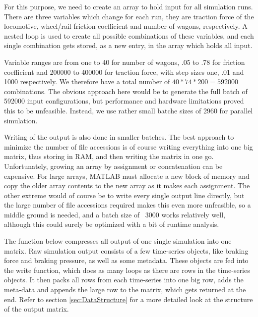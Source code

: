 \par\noindent
 For this purpose, we need to create an array to hold input for all simulation runs. There are three variables which change for each run, they are traction force of the locomotive, wheel/rail friction coefficient and number of wagons, respectively. A nested loop is used to create all possible combinations of these variables, and each single combination gets stored, as a new entry, in the array which holds all input.
\par
Variable ranges are from one to 40 for number of wagons, .05 to .78 for friction coefficient and 200000 to 400000 for traction force, with step sizes one, .01 and 1000 respectively. We therefore have a total number of $40*74*200 =  592000$ combinations. The obvious approach here would be to generate the full batch of 592000 input configurations, but performance and hardware limitations proved this to be unfeasible. Instead, we use rather small batche sizes of 2960 for parallel simulation.
\par
Writing of the output is also done in smaller batches. The best approach to minimize the number of file accessions is of course writing everything into one big matrix, thus storing in RAM, and then writing the matrix in one go. Unfortunately, growing an array by assignment or concatenation can be expensive. For large arrays, MATLAB must allocate a new block of memory and copy the older array contents to the new array as it makes each assignment. The other extreme would of course be to write every single output line directly, but the large number of file accessions required makes this even more unfeasible, so a middle ground is needed, and a batch size of ~3000 works relatively well, although this could surely be optimized with a bit of runtime analysis.
\par
The function below compresses all output of one single simulation into one matrix. Raw simulation output consists of a few time-series objects, like braking force and braking pressure, as well as some metadata. These objects are fed into the write function, which does as many loops as there are rows in the time-series objects. It then packs all rows from each time-series into one big row, adds the meta-data and appends the large row to the matrix, which gets returned at the end. Refer to section \ref{sec:DataStructure} for a more detailed look at the structure of the output matrix.

